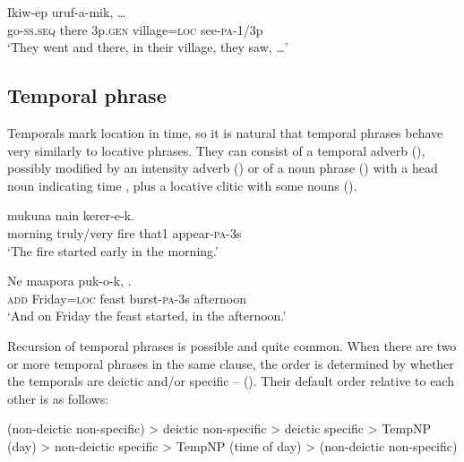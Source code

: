 \ea%
\label{ex:4:x869}
\gll Ikiw-ep      uruf-a-mik,  {\dots }\\
   go-\textsc{ss}.\textsc{seq}  there  3p.\textsc{gen}  village=\textsc{loc}  see-\textsc{pa}-1/3p   \\
\glt`They went and there, in their village, they saw, {\dots}'
\z

\subsection{Temporal phrase} \label{sec:4.6.2}
{}
Temporals mark location in time, so it is natural that temporal phrases behave very similarly to locative phrases.  They can consist of a temporal adverb (), possibly modified by an intensity adverb () or of a noun phrase () with a head noun indicating time , plus a locative clitic with some nouns  ().

\ea%
\label{ex:4:x872}
\gll {}   mukuna  nain  kerer-e-k. \\
    morning  truly/very  fire  that1  appear-\textsc{pa}-3s  \\
\glt`The fire started early in the morning.'
\z

\ea%
\label{ex:4:x873}
\gll Ne    maapora  puk-o-k,  . \\
   \textsc{add}  Friday=\textsc{loc}  feast  burst-\textsc{pa}-3s  afternoon   \\
\glt`And on Friday the feast started, in the afternoon.'
\z

Recursion of temporal phrases is possible and quite common.  When there are two or more temporal phrases in the same clause, the order is determined by whether the temporals are deictic and/or specific -- ().  Their default order relative to each other is as follows:

\ea
(non-deictic non-specific) {{\textgreater}} deictic non-specific {{\textgreater}} deictic specific {{\textgreater}} TempNP (day) {{\textgreater}} non-deictic specific {{\textgreater}} TempNP (time of day) {{\textgreater}} (non-deictic non-specific)
\z

